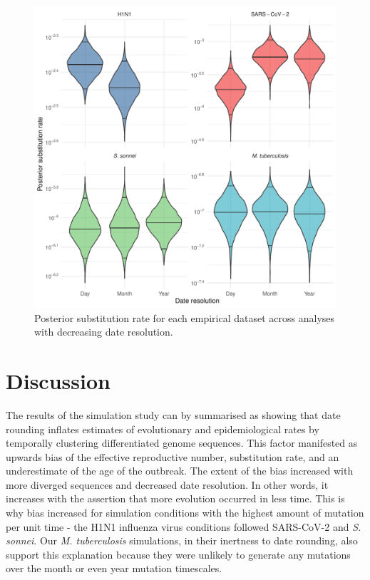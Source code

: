 \documentclass{article}
\begin{document}
\begin{spacing}{1.5}
\begin{figure}[h!]
    \centering
    \includegraphics{empirical_clock.pdf}
    \caption{Posterior substitution rate for each empirical dataset across analyses with decreasing date resolution.}
    \label{fig:empClock}
\end{figure}

\section*{Discussion}

The results of the simulation study can by summarised as showing that date rounding inflates estimates of evolutionary and epidemiological rates by temporally clustering differentiated genome sequences. This factor manifested as upwards bias of the effective reproductive number, substitution rate, and an underestimate of the age of the outbreak. The extent of the bias increased with more diverged sequences and decreased date resolution. In other words, it increases with the assertion that more evolution occurred in less time. This is why bias increased for simulation conditions with the highest amount of mutation per unit time - the H1N1 influenza virus conditions followed SARS-CoV-2 and \textit{S. sonnei}. Our \textit{M. tuberculosis} simulations, in their inertness to date rounding, also support this explanation because they were unlikely to generate any mutations over the month or even year mutation timescales.


\end{spacing}
\end{document}
